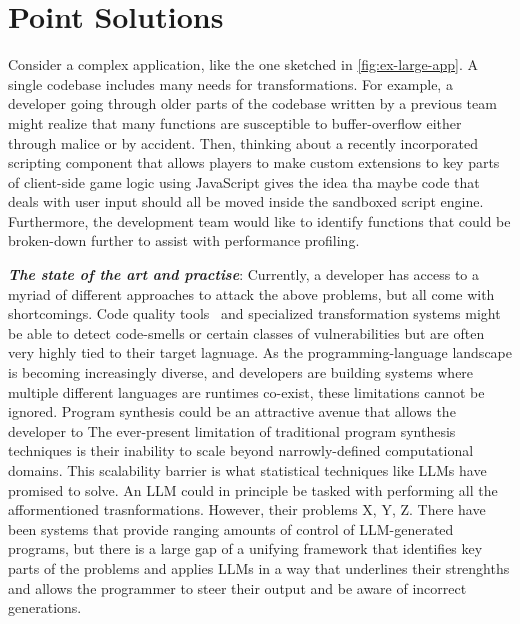 \documentclass[sigplan,review,anonymous,10pt]{acmart}
\newcommand{\heading}[1]{\vspace{2pt}\noindent\textbf{\emph{#1}}:\enspace}
\begin{document}
\section{Point Solutions}
\label{sec:problem}

Consider a complex application, like the one
sketched in \cref{fig:ex-large-app}.
A single codebase includes many needs for transformations.
For example, a developer going through older parts of the codebase written by 
a previous team might realize that many functions are susceptible to buffer-overflow 
either through malice or by accident.
Then, thinking about a recently incorporated scripting component 
that allows players to make custom extensions to key parts of client-side game logic using JavaScript 
gives the idea tha maybe code that deals with user input should all be moved inside 
the sandboxed script engine.
Furthermore, the development team would like to identify functions that could 
be broken-down further to assist with performance profiling.

\heading{The state of the art and practise}
Currently, a developer has access to a myriad of different approaches 
to attack the above problems, but all come with shortcomings.
Code quality tools~\cite{codeql, MORE} and specialized transformation systems might be able to detect 
code-smells or certain classes of vulnerabilities but are often very highly 
tied to their target lagnuage.
As the programming-language landscape is becoming increasingly diverse,
and developers are building systems where multiple different languages are runtimes co-exist,
these limitations cannot be ignored.
Program synthesis could be an attractive avenue that allows 
the developer to 
The ever-present limitation of traditional program synthesis techniques is their 
inability to scale beyond narrowly-defined computational domains.
This scalability barrier is what statistical techniques like LLMs 
have promised to solve.
An LLM could in principle be tasked with performing all the afformentioned trasnformations.
However, their problems X, Y, Z. 
There have been systems that provide ranging amounts of control of LLM-generated 
programs, but there is a large gap of a unifying framework that identifies 
key parts of the problems and applies LLMs in a way that underlines their strenghths 
and allows the programmer to steer their output and be aware of incorrect generations.
\end{document}
